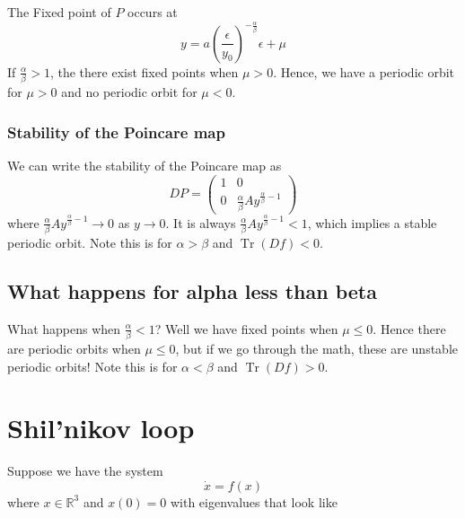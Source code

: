 \documentclass{article}
\begin{document}
The Fixed point of $P$ occurs at 
\[
y = a\left(\frac{\epsilon}{y_0}\right)^{-\frac{\alpha}{\beta}}\epsilon + \mu
\]
If $\frac{\alpha}{\beta} > 1$, the there exist fixed points when $\mu>0$. Hence, we have a periodic orbit for $\mu > 0$ and no periodic orbit for $\mu <0$.

\subsubsection{Stability of the Poincare map}

We can write the stability of the Poincare map as 
\[
DP = \begin{pmatrix}
    1 & 0 \\ 0 & \frac{\alpha}{\beta} A y^{\frac{\alpha}{\beta}-1}
\end{pmatrix}
\]
where $\frac{\alpha}{\beta} A y^{\frac{\alpha}{\beta}-1}\to 0$ as $y\to 0$. It is always $\frac{\alpha}{\beta} A y^{\frac{\alpha}{\beta}-1}<1$, which implies a stable periodic orbit. Note this is for $\alpha>\beta$ and $\operatorname{Tr}(Df)<0$.

\subsection{What happens for alpha less than beta}

What happens when $\frac{\alpha}{\beta}<1$? Well we have fixed points when $\mu\leq 0 $. Hence there are periodic orbits when $\mu\leq 0$, but if we go through the math, these are unstable periodic orbits! Note this is for $\alpha<\beta$ and $\operatorname{Tr}(Df)>0$.

\section{Shil'nikov loop}

Suppose we have the system 
\[
\dot{x}= f(x)
\]
where $x\in\mathbb{R}^3$ and $x(0)=0$ with eigenvalues that look like 

\end{document}
